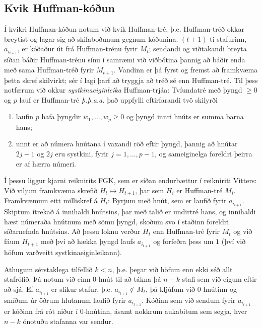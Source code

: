 \documentclass[a4paper,icelandic]{article}
\theoremstyle{default}
\theoremstyle{definition}
\theoremstyle{remark}
\begin{document}
\subsection{Kvik Huffman-kóðun}

Í kvikri Huffman-kóðun notum við kvik Huffman-tré, þ.e. Huffman-tréð
okkar breytist og lagar sig að skilaboðunum gegnum kóðunina.
$(t+1)$-ti stafurinn, $a_{i_{t+1}}$, er kóðaður út frá Huffman-trénu
fyrir $M_t$; sendandi og viðtakandi breyta síðan báðir Huffman-trénu
sínu í samræmi við viðbótina þannig að báðir enda með sama Huffman-tréð
fyrir $M_{t+1}$. Vandinn er þá fyrst og fremst að framkvæma þetta skref
skilvirkt; sér í lagi þarf að tryggja að tréð sé enn Huffman-tré. Til
þess notfærum við okkur \emph{systkinaeiginleika} Huffman-trjáa:
Tvíundatré með þyngd $\ge 0$ og $p$ lauf er Huffman-tré \emph{þ.þ.a.a.}
það uppfylli eftirfarandi tvö skilyrði \cite{vitter87}
\begin{enumerate}
  \item laufin $p$ hafa þyngdir $w_1,\dots,w_p\geq 0$ og þyngd innri
    hnúts er summa barna hans;
  \item unnt er að númera hnútana í vaxandi röð eftir þyngd, þannig að
    hnútar $2j-1$ og $2j$ eru systkini, fyrir $j=1,\dots,p-1$, og
    sameiginelga foreldri þeirra er af hærra númeri.
\end{enumerate}
Í þessu liggur kjarni reiknirits FGK, sem er síðan endurbættur í
reikniriti Vitters: Við viljum framkvæma skrefið $H_t\mapsto H_{t+1}$,
þar sem $H_i$ er Huffman-tré $M_i$. Framkvæmum eitt milliskref á $H_t$:
Byrjum með hnút, sem er laufið fyrir $a_{i_{t+1}}$. Skiptum ítrekað á
innihaldi hnútsins, þar með talið er undirtré hans, og innihaldi hæst
númeraða hnútnum með sömu þyngd, skoðum svo í staðinn foreldri
síðarnefnda hnútsins. Að þessu loknu verður $H_t$ enn Huffman-tré fyrir
$M_t$ og við fáum $H_{t+1}$ með því að hækka þyngd laufs
$a_{i_{t+1}}$ og forfeðra þess um $1$ (því við höfum varðveitt
systkinaeiginleikann).

Athugum sérstaklega tilfellið $k < n$, þ.e. þegar við höfum enn ekki séð
allt stafrófið. Þá notum við einn $0$-hnút til að tákna þá $n-k$ stafi
sem við eigum eftir að sjá. Ef $a_{i_{t+1}}$ er slíkur stafur, þ.e.
$a_{i_{t+1}}\notin M_t$, þá kljúfum við $0$-hnútinn og smíðum úr öðrum
hlutanum laufið fyrir $a_{i_{t+1}}$. Kóðinn sem við sendum fyrir
$a_{i_{t+1}}$ er kóðinn frá rót niður í $0$-hnútinn, ásamt nokkrum
aukabitum sem segja, hver $n-k$ ónotuðu stafanna var sendur.
\end{document}
